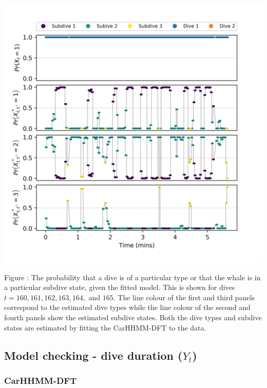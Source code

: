 \documentclass{article}
\begin{document}
        \begin{center}
        \includegraphics[width=6in]{../Plots/CarHMM_decoded_states.png}
        \end{center}
        
        \noindent Figure : The probability that a dive is of a particular type or that the whale is in a particular subdive state, given the fitted model. This is shown for dives $t = 160,161,162,163,164,$ and $165$. The line colour of the first and third panels correspond to the estimated dive types while the line colour of the second and fourth panels show the estimated subdive states. Both the dive types and subdive states are estimated by fitting the CarHHMM-DFT to the data.
        \addtocounter{fignum}{1}
        
    \newpage
    \subsection{Model checking - dive duration ($Y_t$)}
    
        \subsubsection{CarHHMM-DFT}
        
\end{document}
